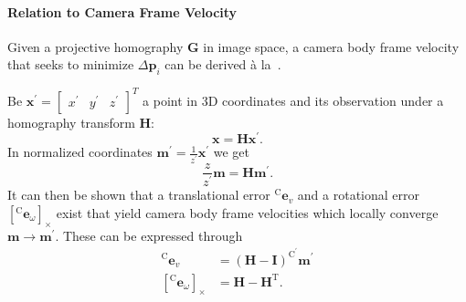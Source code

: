 \paragraph{Relation to Camera Frame Velocity} Given a projective homography $\mathbf{G}$ in image space, a camera body frame velocity that seeks to minimize $\Delta \mathbf{p}_i$ can be derived \`{a} la~\cite{benhimane2006homography}. 

Be $\mathbf{x}^\prime = \begin{bmatrix}
    x^\prime & y^\prime & z^\prime
\end{bmatrix}^T$ a point in 3D coordinates  and its observation under a homography transform $\mathbf{H}$:
\begin{equation}
    \mathbf{x} = \mathbf{H}\mathbf{x}^\prime. 
\end{equation}
In normalized coordinates $\mathbf{m}^\prime = \frac{1}{z^\prime} \mathbf{x}^\prime$ we get
\begin{equation}
    \frac{z}{z^\prime}\mathbf{m} = \mathbf{H} \mathbf{m}^\prime.
\end{equation}
It can then be shown that a translational error $^\text{C}\mathbf{e}_v$ and a rotational error $\left[^\text{C}\mathbf{e}_\omega\right]_\times$ exist that yield camera body frame velocities which locally converge $\mathbf{m} \rightarrow \mathbf{m}^\prime$. These can be expressed through
 \begin{equation}
    \begin{split}
        ^\text{C}\mathbf{e}_v & = (\mathbf{H} - \mathbf{I})^{\text{C}^\prime}\mathbf{m}^\prime\\
        \left[^\text{C}\mathbf{e}_\omega\right]_\times & = \mathbf{H} - \mathbf{H}^\text{T}.
    \end{split}
    \label{in:eq:dc}
\end{equation}







